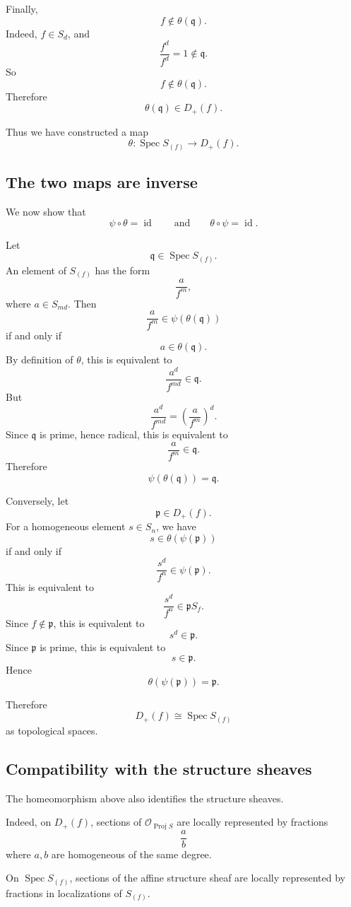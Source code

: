 Finally,
\[
f\notin \theta(\mathfrak q).
\]
Indeed, \(f\in S_d\), and
\[
\frac{f^d}{f^d}=1\notin \mathfrak q.
\]
So
\[
f\notin \theta(\mathfrak q).
\]
Therefore
\[
\theta(\mathfrak q)\in D_+(f).
\]

Thus we have constructed a map
\[
\theta:\operatorname{Spec} S_{(f)}\longrightarrow D_+(f).
\]

\subsection{The two maps are inverse}

We now show that
\[
\psi\circ\theta=\operatorname{id}
\qquad\text{and}\qquad
\theta\circ\psi=\operatorname{id}.
\]

Let
\[
\mathfrak q\in \operatorname{Spec} S_{(f)}.
\]
An element of \(S_{(f)}\) has the form
\[
\frac{a}{f^m},
\]
where \(a\in S_{md}\). Then
\[
\frac{a}{f^m}\in \psi(\theta(\mathfrak q))
\]
if and only if
\[
a\in \theta(\mathfrak q).
\]
By definition of \(\theta\), this is equivalent to
\[
\frac{a^d}{f^{md}}\in \mathfrak q.
\]
But
\[
\frac{a^d}{f^{md}}
=
\left(\frac{a}{f^m}\right)^d.
\]
Since \(\mathfrak q\) is prime, hence radical, this is equivalent to
\[
\frac{a}{f^m}\in \mathfrak q.
\]
Therefore
\[
\psi(\theta(\mathfrak q))=\mathfrak q.
\]

Conversely, let
\[
\mathfrak p\in D_+(f).
\]
For a homogeneous element \(s\in S_n\), we have
\[
s\in \theta(\psi(\mathfrak p))
\]
if and only if
\[
\frac{s^d}{f^n}\in \psi(\mathfrak p).
\]
This is equivalent to
\[
\frac{s^d}{f^n}\in \mathfrak pS_f.
\]
Since \(f\notin \mathfrak p\), this is equivalent to
\[
s^d\in \mathfrak p.
\]
Since \(\mathfrak p\) is prime, this is equivalent to
\[
s\in \mathfrak p.
\]
Hence
\[
\theta(\psi(\mathfrak p))=\mathfrak p.
\]

Therefore
\[
D_+(f)\cong \operatorname{Spec} S_{(f)}
\]
as topological spaces.

\subsection{Compatibility with the structure sheaves}

The homeomorphism above also identifies the structure sheaves.

Indeed, on \(D_+(f)\), sections of \(\mathcal O_{\operatorname{Proj} S}\) are locally represented by
fractions
\[
\frac{a}{b}
\]
where \(a,b\) are homogeneous of the same degree.

On \(\operatorname{Spec} S_{(f)}\), sections of the affine structure sheaf are locally represented by
fractions in localizations of \(S_{(f)}\).

